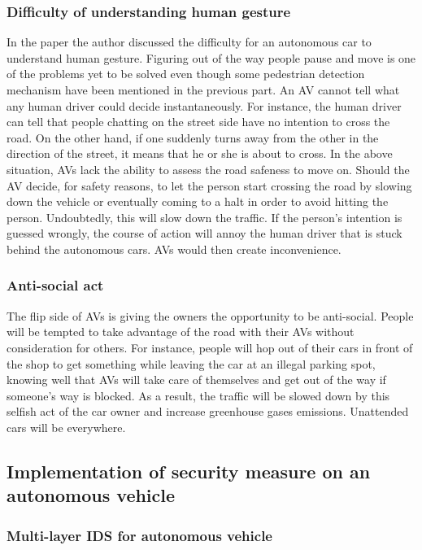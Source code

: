 \subsubsection{Difficulty of understanding human gesture}

In the paper \cite{brooks_robotic_2017} the author discussed the difficulty for an autonomous car to understand human gesture. Figuring out of the way people pause and move is one of the problems yet to be solved even though some pedestrian detection mechanism have been mentioned in the previous part. An AV cannot tell what any human driver could decide instantaneously. For instance, the human driver can tell that people chatting on the street side have no intention to cross the road. On the other hand, if one suddenly turns away from the other in the direction of the street, it means that he or she is about to cross.
In the above situation, AVs lack the ability to assess the road safeness to move on. Should the AV decide, for safety reasons, to let the person start crossing the road by slowing down the vehicle or eventually coming to a halt in order to avoid hitting the person. Undoubtedly, this will slow down the traffic. If the person’s intention is guessed wrongly, the course of action will annoy the human driver that is stuck behind the autonomous cars. AVs would then create inconvenience.


\subsubsection{Anti-social act}

The flip side of AVs is giving the owners the opportunity to be anti-social. People will be tempted to take advantage of the road with their AVs without consideration for others. For instance, people will hop out of their cars in front of the shop to get something while leaving the car at an illegal parking spot, knowing well that AVs will take care of themselves and get out of the way if someone’s way is blocked. As a result, the traffic will be slowed down by this selfish act of the car owner and increase greenhouse gases emissions. Unattended cars will be everywhere.

\subsection{Implementation of security measure on an autonomous vehicle}

\subsubsection{Multi-layer IDS for autonomous vehicle}

